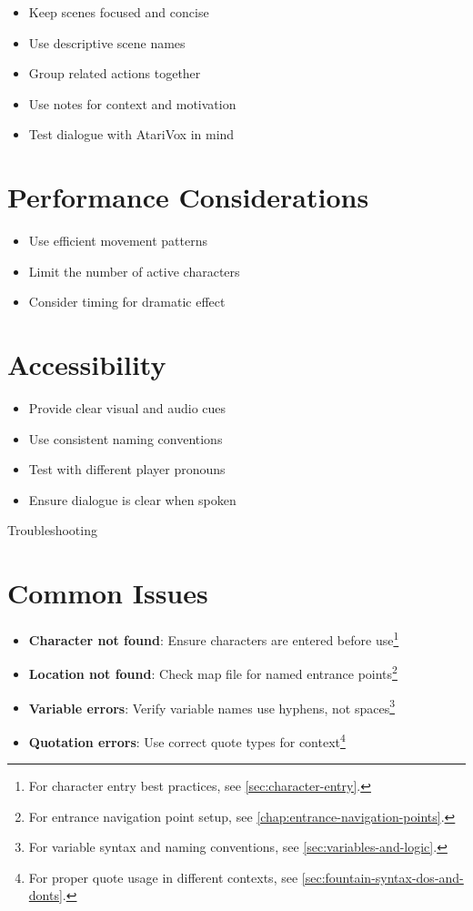 \documentclass[11pt,letterpaper,oldstylefigures]{memoir}
\makeatletter
\let\oldchapter\chapter
\def\chapter{%
  \@ifstar
    {\FountainScripting@starchapter}%
    {\@dblarg\FountainScripting@chapter}}
\def\FountainScripting@starchapter#1{\oldchapter*{#1}\chaptermark{#1}}
\def\FountainScripting@chapter[#1]#2{\oldchapter[#1]{#2}\chaptermark{#2}}
\makeatother
\begin{document}
\begin{itemize}
\item Keep scenes focused and concise
\item Use descriptive scene names
\item Group related actions together
\item Use notes for context and motivation
\item Test dialogue with AtariVox in mind
\end{itemize}

\section{Performance Considerations}

\begin{itemize}
\item Use efficient movement patterns
\item Limit the number of active characters
\item Consider timing for dramatic effect
\end{itemize}

\section{Accessibility}

\begin{itemize}
\item Provide clear visual and audio cues
\item Use consistent naming conventions
\item Test with different player pronouns
\item Ensure dialogue is clear when spoken
\end{itemize}

\chapter{Troubleshooting}

\section{Common Issues}

\begin{itemize}
\item \textbf{Character not found}: Ensure characters are entered before use\footnote{For character entry best practices, see \autoref{sec:character-entry}.}
\item \textbf{Location not found}: Check map file for named entrance points\footnote{For entrance navigation point setup, see \autoref{chap:entrance-navigation-points}.}
\item \textbf{Variable errors}: Verify variable names use hyphens, not spaces\footnote{For variable syntax and naming conventions, see \autoref{sec:variables-and-logic}.}
\item \textbf{Quotation errors}: Use correct quote types for context\footnote{For proper quote usage in different contexts, see \autoref{sec:fountain-syntax-dos-and-donts}.}
\end{itemize}
\end{document}
